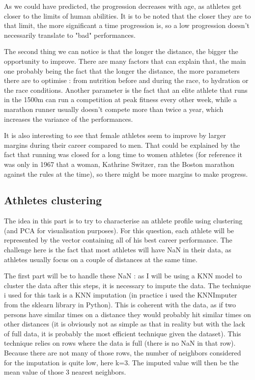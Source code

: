 \documentclass[10pt, a4paper]{article}
\begin{document}
As we could have predicted, the progression decreases with age, as athletes get closer to the limits of human abilities. It is to be noted that the closer they are to that limit, the more significant a time progression is, so a low progression doesn't necessarily translate to "bad" performances. 

The second thing we can notice is that the longer the distance, the bigger the opportunity to improve. There are many factors that can explain that, the main one probably being the fact that the longer the distance, the more parameters there are to optimise : from nutrition before and during the race, to hydration or the race conditions. Another parameter is the fact that an elite athlete that runs in the 1500m can run a competition at peak fitness every other week, while a marathon runner usually doesn't compete more than twice a year, which increases the variance of the performances.

It is also interesting to see that female athletes seem to improve by larger margins during their career compared to men. That could be explained by the fact that running was closed for a long time to women athletes (for reference it was only in 1967 that a woman, Kathrine Switzer, ran the Boston marathon against the rules at the time), so there might be more margins to make progress. \\

\subsection{Athletes clustering}

The idea in this part is to try to characterise an athlete profile using clustering (and PCA for visualisation purposes). For this question, each athlete will be represented by the vector containing all of his best career performance. The challenge here is the fact that most athletes will have NaN in their data, as athletes usually focus on a couple of distances at the same time. 

The first part will be to handle these NaN : as I will be using a KNN model to cluster the data after this steps, it is necessary to impute the data. The technique i used for this task is a KNN imputation (in practice i used the KNNImputer from the sklearn library in Python). This is coherent with the data, as if two persons have similar times on a distance they would probably hit similar times on other distances (it is obviously not as simple as that in reality but with the lack of full data, it is probably the most efficient technique given the dataset). This technique relies on rows where the data is full (there is no NaN in that row). Because there are not many of those rows, the number of neighbors considered for the imputation is quite low, here k=3. The imputed value will then be the mean value of those 3 nearest neighbors.
\end{document}
